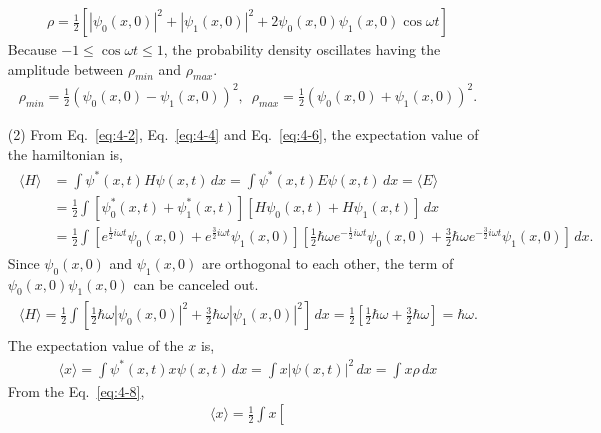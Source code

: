 \documentclass[floatfix,nofootinbib,superscriptaddress,fleqn]{revtex4-2}
\begin{document}
\begin{itemize}
\begin{align}
    \rho =\frac{1}{2}\left[
      |\psi_0(x,0)|^2+|\psi_1(x,0)|^2
      +2\psi_0(x,0)\psi_1(x,0)\cos{\omega t}\right]
  \end{align}
  Because $-1\leq \cos{\omega t}\leq 1$, the probability density oscillates
  having the amplitude between $\rho_{min}$ and $\rho_{max}$.
  \begin{align}
    \rho_{min} = \frac{1}{2}\left(\psi_0(x,0)-\psi_1(x,0)
      \right)^2,\,\,\,
      \rho_{max} = \frac{1}{2}\left(\psi_0(x,0)+\psi_1(x,0)
      \right)^2.
  \end{align}
  \item[(2)]
   From Eq.~\eqref{eq:4-2}, Eq.~\eqref{eq:4-4} and Eq.~\eqref{eq:4-6}, 
   the expectation value of the hamiltonian is,
  \begin{align}
    \begin{split}
      \langle H \rangle &= \int \psi^*(x,t)H\psi(x,t)\,dx
      = \int \psi^*(x,t)E\psi(x,t)\,dx
      =\langle E \rangle  \\
      &=\frac{1}{2}\int
      [\psi_0^*(x,t) + \psi_1^*(x,t)][H\psi_0(x,t) + H\psi_1(x,t)]
      \,dx \\
      &=\frac{1}{2}\int
      \left[e^{\frac{1}{2}i\omega t}\psi_0(x,0) 
      + e^{\frac{3}{2}i\omega t}\psi_1(x,0)\right]
      \left[\frac{1}{2}\hbar\omega e^{-\frac{1}{2}i\omega t}\psi_0(x,0) 
      + \frac{3}{2}\hbar\omega 
      e^{-\frac{3}{2}i\omega t}\psi_1(x,0)\right]
      \,dx.
    \end{split}
  \end{align}
  Since $\psi_0(x,0)$ and $\psi_1(x,0)$ are orthogonal to each other,
  the term of $\psi_0(x,0)\psi_1(x,0)$ can be canceled out.
  \begin{align}\label{eq:4-9}
    \begin{split}
      \langle H \rangle = \frac{1}{2}\int
      \left[\frac{1}{2}\hbar\omega |\psi_0(x,0)|^2 
      + \frac{3}{2}\hbar\omega |\psi_1(x,0)|^2\right]
      \,dx
      =\frac{1}{2}\left[\frac{1}{2}\hbar\omega
      +\frac{3}{2}\hbar\omega\right]
      =\hbar\omega.
    \end{split}
  \end{align}
  The expectation value of the $x$ is,
  \begin{align}
    \langle x \rangle = \int \psi^*(x,t)x\psi(x,t)\,dx
    =\int x|\psi(x,t)|^2\,dx=\int x\rho\,dx
  \end{align}
  From the Eq.~\eqref{eq:4-8},
  \begin{align}\label{eq:4-11}
    \langle x \rangle=\frac{1}{2}\int x\left[

\end{align}
\end{itemize}
\end{document}
